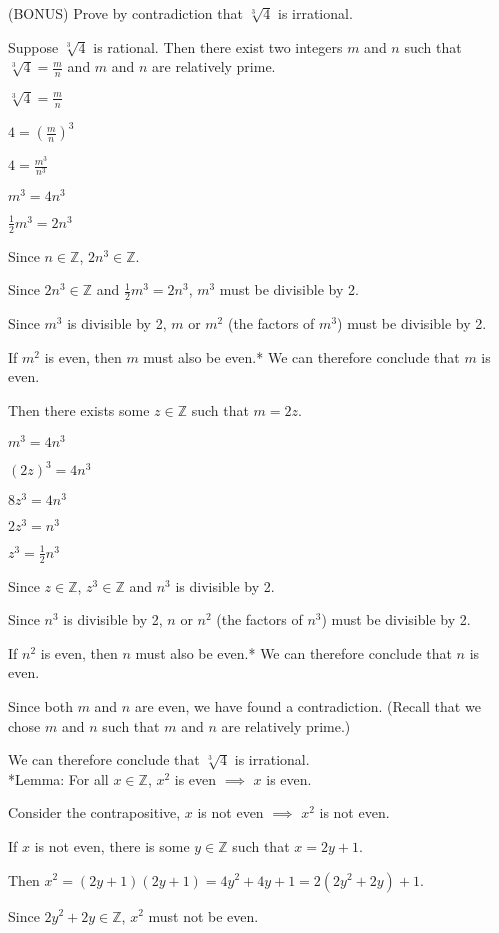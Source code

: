 \documentclass[solution, letterpaper]{cs20inclass}
\begin{document}
\problem

(BONUS) Prove by contradiction that $\sqrt[3]{4}$ is irrational.

\begin{solution}

Suppose $\sqrt[3]{4}$ is rational. Then there exist two integers $m$ and $n$ such that $\sqrt[3]{4} = \frac{m}{n}$ and $m$ and $n$ are relatively prime.

\begin{center}
$\sqrt[3]{4} = \frac{m}{n}$

$4 = (\frac{m}{n})^3$

$4 = \frac{m^3}{n^3}$

$m^3 = 4n^3$

$\frac{1}{2}m^3 = 2n^3$
\end{center}

Since $n \in \mathbb{Z}$, $2n^3 \in \mathbb{Z}$.

Since $2n^3 \in \mathbb{Z}$ and $\frac{1}{2}m^3 = 2n^3$, $m^3$ must be divisible by 2. 

Since $m^3$ is divisible by 2, $m$ or $m^2$ (the factors of $m^3$) must be divisible by 2.

If $m^2$ is even, then $m$ must also be even.* We can therefore conclude that $m$ is even.

Then there exists some $z \in \mathbb{Z}$ such that $m=2z$.

\begin{center}
$m^3 = 4n^3$

$(2z)^3 = 4n^3$

$8z^3 = 4n^3$

$2z^3 = n^3$

$z^3 = \frac{1}{2}n^3$
\end{center}

Since $z \in \mathbb{Z}$, $z^3 \in \mathbb{Z}$ and $n^3$ is divisible by 2.

Since $n^3$ is divisible by 2, $n$ or $n^2$ (the factors of $n^3$) must be divisible by 2.

If $n^2$ is even, then $n$ must also be even.* We can therefore conclude that $n$ is even.

Since both $m$ and $n$ are even, we have found a contradiction. (Recall that we chose $m$ and $n$ such that $m$ and $n$ are relatively prime.)

We can therefore conclude that $\sqrt[3]{4}$ is irrational.\\

*Lemma: For all $x \in \mathbb{Z}$, $x^2$ is even $\implies$ $x$ is even. 

Consider the contrapositive, $x$ is not even $\implies$ $x^2$ is not even.

If $x$ is not even, there is some $y \in \mathbb{Z}$ such that $x = 2y + 1$.

Then $x^2 = (2y+1)(2y+1) = 4y^2 + 4y + 1 = 2(2y^2+2y)+1$.

Since $2y^2+2y \in \mathbb{Z}$, $x^2$ must not be even.

\end{solution}
\end{document}
